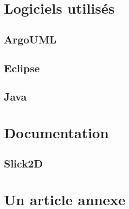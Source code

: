 \documentclass{report}
\begin{document}
\chapter{Logiciels utilisés}
\section{ArgoUML}
\section{Eclipse}
\section{Java}

\appendix
\chapter{Documentation}
\section{Slick2D}

\chapter{Un article annexe}
\end{document}

